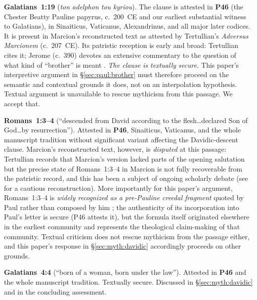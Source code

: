 \documentclass[12pt,oneside]{article}
\newcommand{\grk}[1]{\textit{#1}}   %
\begin{document}
\textbf{Galatians~1:19} (\grk{ton adelphon tou kyriou}).  The clause
is attested in \textbf{P46} (the Chester Beatty Pauline papyrus,
c.~200~CE and our earliest substantial witness to Galatians), in
Sinaiticus, Vaticanus, Alexandrinus, and all major later codices.
It is present in Marcion's reconstructed text as attested by
Tertullian's \textit{Adversus Marcionem} (c.~207~CE).  Its patristic
reception is early and broad: Tertullian cites it; Jerome (c.~390)
devotes an extensive commentary to the question of what kind of
``brother'' is meant \citep{Lightfoot1869}.  \textit{The clause is
textually secure.}  This paper's interpretive argument in
§\ref{sec:paul:brother} must therefore proceed on the semantic and
contextual grounds it does, not on an interpolation hypothesis.
Textual argument is unavailable to rescue mythicism from this
passage.  We accept that.

\textbf{Romans~1:3--4} (\enquote{descended from David according to
the flesh\ldots declared Son of God\ldots by resurrection}).
Attested in \textbf{P46}, Sinaiticus, Vaticanus, and the whole
manuscript tradition without significant variant affecting the
Davidic-descent clause.  Marcion's reconstructed text, however, is
\textit{disputed} at this passage: Tertullian records that Marcion's
version lacked parts of the opening salutation but the precise
state of Romans~1:3--4 in Marcion is not fully recoverable from the
patristic record, and this has been a subject of ongoing scholarly
debate (see \citealt{BeDuhn2013} for a cautious reconstruction).
More importantly for this paper's argument, Romans~1:3--4 is
\textit{widely recognized as a pre-Pauline creedal fragment}
quoted by Paul rather than composed by him \citep{Jewett2007}; the
authenticity of its incorporation into Paul's letter is secure
(P46 attests it), but the formula itself originated elsewhere in
the earliest community and represents the theological claim-making
of that community.  Textual criticism does not rescue mythicism
from the passage either, and this paper's response in
§\ref{sec:myth:davidic} accordingly proceeds on other grounds.

\textbf{Galatians~4:4} (\enquote{born of a woman, born under the
law}).  Attested in \textbf{P46} and the whole manuscript
tradition.  Textually secure.  Discussed in §\ref{sec:myth:davidic}
and in the concluding assessment.
\end{document}
